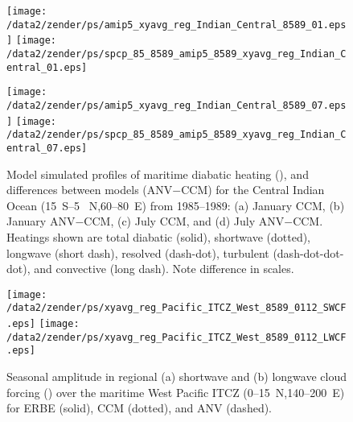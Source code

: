 \documentclass[twocolumn,final]{article}
\begin{document}
\begin{figure*}
\begin{center}
\texttt{[image: /data2/zender/ps/amip5\_xyavg\_reg\_Indian\_Central\_8589\_01.eps]}%
\texttt{[image: /data2/zender/ps/spcp\_85\_8589\_amip5\_8589\_xyavg\_reg\_Indian\_Central\_01.eps]}%

\texttt{[image: /data2/zender/ps/amip5\_xyavg\_reg\_Indian\_Central\_8589\_07.eps]}%
\texttt{[image: /data2/zender/ps/spcp\_85\_8589\_amip5\_8589\_xyavg\_reg\_Indian\_Central\_07.eps]}%
\end{center}
\caption[Model simulated profiles of maritime diabatic heating
and differences between models (ANV$-$CCM) for the
Central Indian Ocean from 1985--1989]{
Model simulated profiles of maritime diabatic heating
(\kxday), and differences between models (ANV$-$CCM) for the
Central Indian Ocean (15~\degreee S--5~\degreee
N,60--80~\degreee E) from 1985--1989: (a) January CCM, (b) January
ANV$-$CCM, (c) July 
CCM, and  (d) July ANV$-$CCM. 
Heatings shown are total diabatic (solid), shortwave (dotted),
longwave (short dash), resolved (dash-dot), turbulent
(dash-dot-dot-dot), and convective (long dash).
Note difference in scales.
\label{fig:xyavg_reg_Indian_Central_8589}}
\end{figure*}
\clearpage

\begin{figure}
\begin{center}
\texttt{[image: /data2/zender/ps/xyavg\_reg\_Pacific\_ITCZ\_West\_8589\_0112\_SWCF.eps]}\vfill
\texttt{[image: /data2/zender/ps/xyavg\_reg\_Pacific\_ITCZ\_West\_8589\_0112\_LWCF.eps]}\vfill
\end{center}
\caption[Seasonal amplitude in regional shortwave and longwave
cloud forcing over the maritime West Pacific ITCZ
for ERBE, CCM, and ANV]{
Seasonal amplitude in regional (a) shortwave and (b) longwave
cloud forcing (\wxmS ) over the maritime West Pacific ITCZ
(0--15~\degreee N,140--200~\degreee E) for ERBE (solid), CCM
(dotted), and ANV (dashed).
\label{fig:xyavg_reg_8589_0112_ocean_CF}}
\end{figure}
\end{document}
